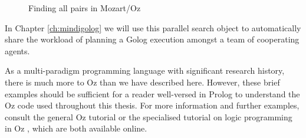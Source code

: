 %
\begin{figure}[t]

\caption{Finding all pairs in Mozart/Oz\label{fig:Background:Parallel-All-Pairs}}

\end{figure}


In Chapter \ref{ch:mindigolog} we will use this parallel search object
to automatically share the workload of planning a Golog execution
amongst a team of cooperating agents.

As a multi-paradigm programming language with significant research
history, there is much more to Oz than we have described here. However,
these brief examples should be sufficient for a reader well-versed
in Prolog to understand the Oz code used throughout this thesis. For
more information and further examples, consult the general Oz tutorial
\citep{haridi99oz_tutorial} or the specialised tutorial on logic
programming in Oz \citep{lpinoz99}, which are both available online.

